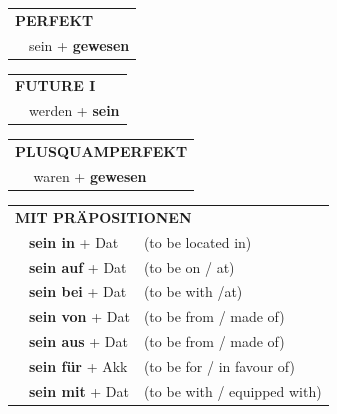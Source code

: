 \documentclass[10pt,a4paper]{revtex4-2}
\begin{document}
\begin{verbbox-nom}
    \vspace{10pt}
 
    \begin{tabular}{ll}
     \multicolumn{2}{l}{\textbf{PERFEKT}}\\
   &  sein + \textbf{gewesen}\\
  \end{tabular}
\hfill
   \begin{tabular}{ll}
   
    \multicolumn{2}{l}{\textbf{FUTURE I}}\\
   & werden + \textbf{sein}\\
 
  \end{tabular}
\hfill
   \begin{tabular}{ll}
      \multicolumn{2}{l}{\textbf{PLUSQUAMPERFEKT}}\\
   & waren + \textbf{gewesen}\\
  \end{tabular}
  
  \vspace{10pt}

   \begin{tabular}{lll}
      \multicolumn{3}{l}{\textbf{MIT PRÄPOSITIONEN}}\\
& \textbf{sein in} + Dat & (to be located in)\\
& \textbf{sein auf} + Dat & (to be on / at)\\
&\textbf{sein bei} + Dat & (to be with /at)\\
&\textbf{sein von} + Dat & (to be from / made of)\\
&\textbf{sein aus} + Dat & (to be from / made of)\\
&\textbf{sein für} + Akk & (to be for / in favour of)\\
&\textbf{sein mit} + Dat & (to be with / equipped with)
  \end{tabular}
  \hfill



  \vspace{-5pt}

\end{verbbox-nom}
\end{document}
